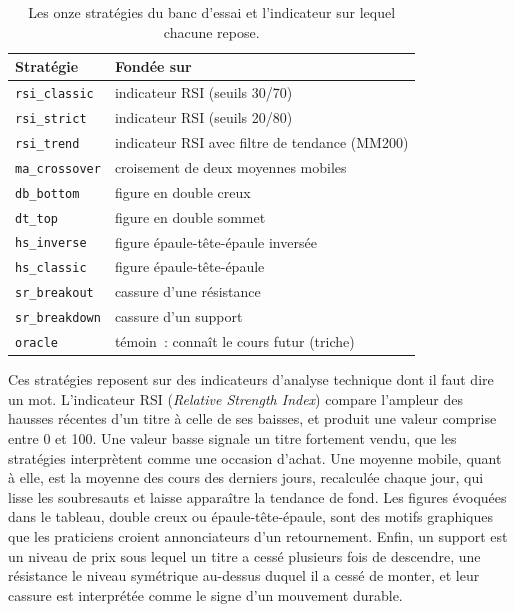 \begin{table}[H]
\centering
\caption{Les onze stratégies du banc d'essai et l'indicateur sur lequel chacune repose.}
\label{tab:strategies}
\renewcommand{\arraystretch}{1.25}
\small
\begin{tabular}{@{}ll@{}}
\toprule
Stratégie & Fondée sur \\
\midrule
\texttt{rsi\_classic}  & indicateur RSI (seuils 30/70) \\
\texttt{rsi\_strict}   & indicateur RSI (seuils 20/80) \\
\texttt{rsi\_trend}    & indicateur RSI avec filtre de tendance (MM200) \\
\texttt{ma\_crossover} & croisement de deux moyennes mobiles \\
\texttt{db\_bottom}    & figure en double creux \\
\texttt{dt\_top}       & figure en double sommet \\
\texttt{hs\_inverse}   & figure épaule-tête-épaule inversée \\
\texttt{hs\_classic}   & figure épaule-tête-épaule \\
\texttt{sr\_breakout}  & cassure d'une résistance \\
\texttt{sr\_breakdown} & cassure d'un support \\
\midrule
\texttt{oracle}        & témoin~: connaît le cours futur (triche) \\
\bottomrule
\end{tabular}
\end{table}

Ces stratégies reposent sur des indicateurs d'analyse technique dont il faut
dire un mot. L'indicateur RSI (\emph{Relative Strength Index}) compare
l'ampleur des hausses récentes d'un titre à celle de ses baisses, et produit
une valeur comprise entre 0 et 100. Une valeur basse signale un titre
fortement vendu, que les stratégies interprètent comme une occasion d'achat.
Une moyenne mobile, quant à elle, est la moyenne des cours des derniers jours,
recalculée chaque jour, qui lisse les soubresauts et laisse apparaître la
tendance de fond. Les figures évoquées dans le tableau, double creux ou
épaule-tête-épaule, sont des motifs graphiques que les praticiens croient
annonciateurs d'un retournement. Enfin, un support est un niveau de prix sous
lequel un titre a cessé plusieurs fois de descendre, une résistance le niveau
symétrique au-dessus duquel il a cessé de monter, et leur cassure est
interprétée comme le signe d'un mouvement durable.

